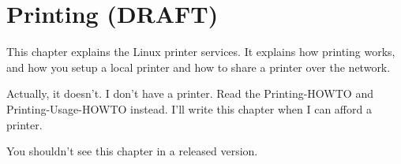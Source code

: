 \chapter{Printing (DRAFT)}
\label{chap:printing}

	\noindent
	This chapter explains the Linux printer services.  It explains
	how printing works, and how you setup a local printer and how
	to share a printer over the network.
	
	Actually, it doesn't.  I don't have a printer.  Read the
	Printing-HOWTO and Printing-Usage-HOWTO instead.
	I'll write this chapter when I can afford a printer.

	You shouldn't see this chapter in a released version.
